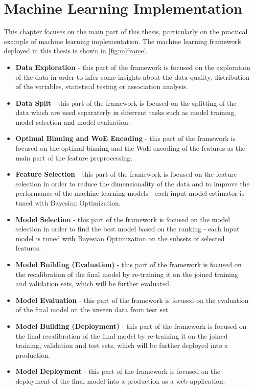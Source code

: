     \chapter{Machine Learning Implementation}
    \label{chap:four}
    This chapter focuses on the main part of this thesis, particularly on the practical example of machine learning implementation. The machine learning framework deployed in this thesis is shown in \autoref{fig:mlframe}.
    \begin{itemize}\setlength\itemsep{0em}
        \item \textbf{Data Exploration} - this part of the framework is focused on the exploration of the data in order to infer some insights about the data quality, distribution of the variables, statistical testing or association analysis.
        \item \textbf{Data Split} - this part of the framework is focused on the splitting of the data which are used separaterly in diferrent tasks such as model training, model selection and model evaluation.
        \item \textbf{Optimal Binning and WoE Encoding} - this part of the framework is focused on the optimal binning and the WoE encoding of the features as the main part of the feature preprocessing.
        \item \textbf{Feature Selection} - this part of the framework is focused on the feature selection in order to reduce the dimensionality of the data and to improve the performance of the machine learning models - each input model estimator is tuned with Bayesian Optimization.
        \item \textbf{Model Selection} - this part of the framework is focused on the model selection in order to find the best model based on the ranking - each input model is tuned with Bayesian Optimization on the subsets of selected features.
        \item \textbf{Model Building (Evaluation)} - this part of the framework is focused on the recalibration of the final model by re-training it on the joined training and validation sets, which will be further evaluated.
        \item \textbf{Model Evaluation} - this part of the framework is focused on the evaluation of the final model on the unseen data from test set.
        \item \textbf{Model Building (Deployment)} - this part of the framework is focused on the final recalibration of the final model by re-training it on the joined training, validation and test sets, which will be further deployed into a production.
        \item \textbf{Model Deployment} - this part of the framework is focused on the deployment of the final model into a production as a web application.
    \end{itemize}

